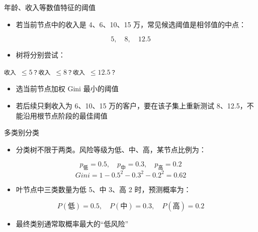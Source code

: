 \documentclass[10pt,aspectratio=43]{beamer}
\begin{document}
\begin{frame}{年龄、收入等数值特征的阈值}
  \begin{itemize}
    \item 若当前节点中的收入是 4、6、10、15 万，常见候选阈值是相邻值的中点：
  \end{itemize}
  \[
    5,\quad 8,\quad 12.5
  \]
  \begin{itemize}
    \item 树将分别尝试：
  \end{itemize}
  \begin{center}
    \texttt{收入 $\le 5$？\qquad 收入 $\le 8$？\qquad 收入 $\le 12.5$？}
  \end{center}
  \begin{itemize}
    \item 选当前节点加权 Gini 最小的阈值
    \item 若后续只剩收入为 6、10、15 万的客户，要在该子集上重新测试 8、12.5，不能沿用根节点阶段的最佳阈值
  \end{itemize}
\end{frame}

\begin{frame}{多类别分类}
  \begin{itemize}
    \item 分类树不限于两类。风险等级为低、中、高，某节点比例为：
  \end{itemize}
  \[
    p_{\text{低}}=0.5,\quad p_{\text{中}}=0.3,\quad p_{\text{高}}=0.2
  \]
  \[
    Gini=1-0.5^2-0.3^2-0.2^2=0.62
  \]
  \begin{itemize}
    \item 叶节点中三类数量为低 5、中 3、高 2 时，预测概率为：
  \end{itemize}
  \[
    P(\text{低})=0.5,\quad P(\text{中})=0.3,\quad P(\text{高})=0.2
  \]
  \begin{itemize}
    \item 最终类别通常取概率最大的“低风险”
  \end{itemize}
\end{frame}
\end{document}

